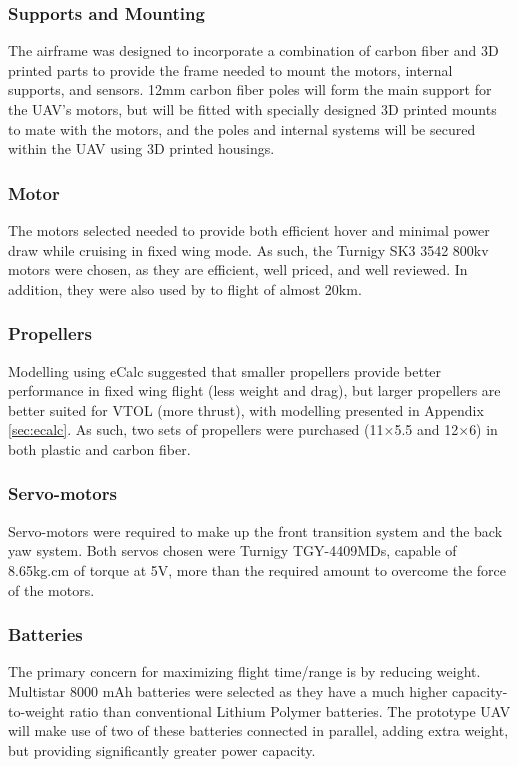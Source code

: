 \subsubsection*{Supports and Mounting}
The airframe was designed to incorporate a combination of carbon fiber and 3D printed parts to provide the frame needed to mount the motors, internal supports, and sensors. 12mm carbon fiber poles will form the main support for the UAV's motors, but will be fitted with specially designed 3D printed mounts to mate with the motors, and the poles and internal systems will be secured within the UAV using 3D printed housings.
	
\subsubsection*{Motor}
The motors selected needed to provide both efficient hover and minimal power draw while cruising in fixed wing mode. As such, the Turnigy SK3 3542 800kv motors were chosen, as they are efficient, well priced, and well reviewed. In addition, they were also used by \cite{ref:fireflyinstruction} to flight of almost 20km.
	
\subsubsection*{Propellers}
Modelling using eCalc suggested that smaller propellers provide better performance in fixed wing flight (less weight and drag), but larger propellers are better suited for VTOL (more thrust), with modelling presented in Appendix \ref{sec:ecalc}. As such, two sets of propellers were purchased (11$\times$5.5 and 12$\times$6) in both plastic and carbon fiber.
	
\subsubsection*{Servo-motors}
Servo-motors were required to make up the front transition system and the back yaw system. Both servos chosen were Turnigy TGY-4409MDs, capable of 8.65kg.cm of torque at 5V, more than the required amount to overcome the force of the motors. 
		
\subsubsection*{Batteries}
The primary concern for maximizing flight time/range is by reducing weight. Multistar 8000 mAh batteries were selected as they have a much higher capacity-to-weight ratio than conventional Lithium Polymer batteries. The prototype UAV will make use of two of these batteries connected in parallel, adding extra weight, but providing significantly greater power capacity.

